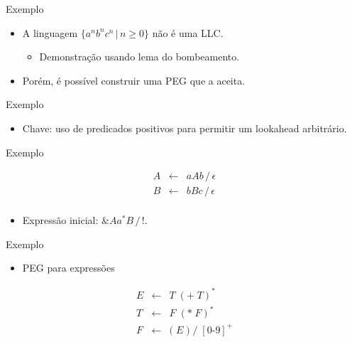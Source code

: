 \begin{frame}{Exemplo}

    \begin{itemize}

        \item
        A linguagem \(\{a^nb^nc^n\,|\,n\geq 0\}\) não é uma LLC.

        \begin{itemize}

            \item
            Demonstração usando lema do bombeamento.
        \end{itemize}
        \item
        Porém, é possível construir uma PEG que a aceita.
    \end{itemize}
\end{frame}

\begin{frame}{Exemplo}

    \begin{itemize}

        \item
        Chave: uso de predicados positivos para permitir um lookahead
        arbitrário.
    \end{itemize}
\end{frame}

\begin{frame}{Exemplo}

    \[
    \begin{array}{lcl}
        A & \leftarrow & a A b\,/\,\epsilon\\
        B & \leftarrow & b B c\,/\,\epsilon\\
    \end{array}
    \]

    \begin{itemize}

        \item
        Expressão inicial: \(\& A a^*B\,/\,!.\)
    \end{itemize}
\end{frame}

\begin{frame}{Exemplo}

    \begin{itemize}

        \item
        PEG para expressões
    \end{itemize}

    \[\begin{array}{lcl}
    E &\leftarrow& T\; (\texttt{+}\; T)^* \\
    T &\leftarrow& F\; (*\; F)^* \\
    F &\leftarrow& \texttt{(}\; E\; \texttt{)} \;/\; [0\text{-}9]^+
\end{array}\]
\end{frame}

